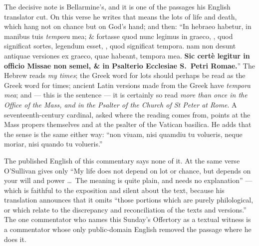 \begin{witnessnote}
The decisive note is Bellarmine's, and it is one of the passages his English
translator cut. On this verse he writes that  means the lots of
life and death, which hang not on chance but on God's hand; and then: ``In
hebraeo habetur, in manibus tuis \emph{tempora} mea; \& fortasse quod nunc
legimus in graeco, , quod significat sortes, legendum esset,
, quod significat tempora. nam non desunt antiquae versiones ex
graeco, quae habeant, tempora mea. \textbf{Sic certè legitur in officio Missae
non semel, \& in Psalterio Ecclesiae S.\ Petri Romae.}'' The Hebrew reads
\textit{my times}; the Greek word for lots should perhaps be read as the Greek
word for times; ancient Latin versions made from the Greek have \textit{tempora
mea}; and --- this is the sentence --- it is certainly so read \emph{more than
once in the Office of the Mass, and in the Psalter of the Church of St Peter at
Rome}. A seventeenth-century cardinal, asked where the reading comes from,
points at the Mass propers themselves and at the psalter of the Vatican
basilica. He adds that the sense is the same either way: ``non viuam, nisi
quamdiu tu volueris, neque moriar, nisi quando tu volueris.''

The published English of this commentary says none of it. At the same verse
O'Sullivan gives only ``My life does not depend on lot or chance, but depends
on your will and power \dots\ The meaning is quite plain, and needs no
explanation'' --- which is faithful to the exposition and silent about the
text, because his translation announces that it omits ``those portions which
are purely philological, or which relate to the discrepancy and reconciliation
of the texts and versions.'' The one commentator who names this Sunday's
Offertory as a textual witness is a commentator whose only public-domain
English removed the passage where he does it.
\end{witnessnote}

